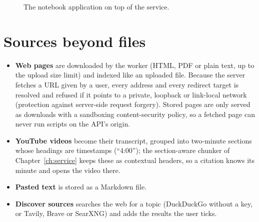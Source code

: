 \begin{figure}[H]
\centering
{}
\caption{The notebook application on top of the service.}
\label{fig:notebook_arch}
\end{figure}

\section{Sources beyond files}
\begin{itemize}
\item \textbf{Web pages} are downloaded by the worker (HTML, PDF or plain text, up to the upload size limit) and indexed like an uploaded file. Because the server fetches a URL given by a user, every address and every redirect target is resolved and refused if it points to a private, loopback or link-local network (protection against server-side request forgery). Stored pages are only served as downloads with a sandboxing content-security policy, so a fetched page can never run scripts on the API's origin.
\item \textbf{YouTube videos} become their transcript, grouped into two-minute sections whose headings are timestamps (``4:00''); the section-aware chunker of Chapter~\ref{ch:service} keeps these as contextual headers, so a citation knows its minute and opens the video there.
\item \textbf{Pasted text} is stored as a Markdown file.
\item \textbf{Discover sources} searches the web for a topic (DuckDuckGo without a key, or Tavily, Brave or SearXNG) and adds the results the user ticks.
\end{itemize}

